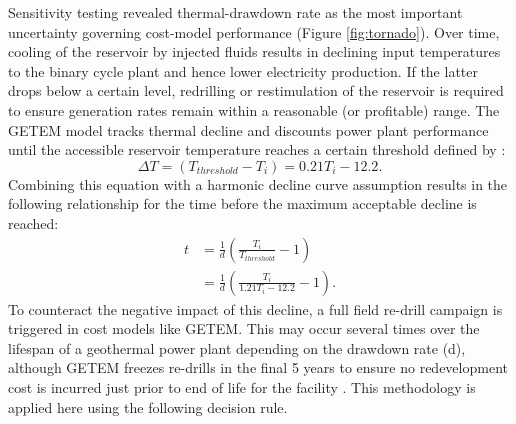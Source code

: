 Sensitivity testing revealed thermal-drawdown rate as the most important uncertainty governing cost-model performance (Figure \ref{fig:tornado}). Over time, cooling of the reservoir by injected fluids results in declining input temperatures to the binary cycle plant and hence lower electricity production. If the latter drops below a certain level, redrilling or restimulation of the reservoir is required to ensure generation rates remain within a reasonable (or profitable) range. The GETEM model tracks thermal decline and discounts power plant performance until the accessible reservoir temperature reaches a certain threshold defined by \citep{entingh_volume_2006}:
\begin{equation}
\label{eq:drawdown_threshold}
    \Delta T = (T_{threshold}-T_i) = 0.21  T_i - 12.2.
\end{equation}
Combining this equation with a harmonic decline curve assumption results in the following relationship for the time before the maximum acceptable decline is reached:
\begin{equation}
\label{eq:redevelop_time}
\begin{aligned}
    t &= \frac{1}{d} 
    \left(\frac{T_i}{T_{threshold}} - 1
    \right)\\
    &= \frac{1}{d} 
    \left( \frac{T_i}{1.21  T_i - 12.2}
     - 1
    \right).
\end{aligned}
\end{equation}
To counteract the negative impact of this decline, a full field re-drill campaign is triggered in cost models like GETEM. This may occur several times over the lifespan of a geothermal power plant depending on the drawdown rate (d), although GETEM freezes re-drills in the final 5 years to ensure no redevelopment cost is incurred just prior to end of life for the facility \citep{entingh_volume_2006}. This methodology is applied here using the following decision rule.

